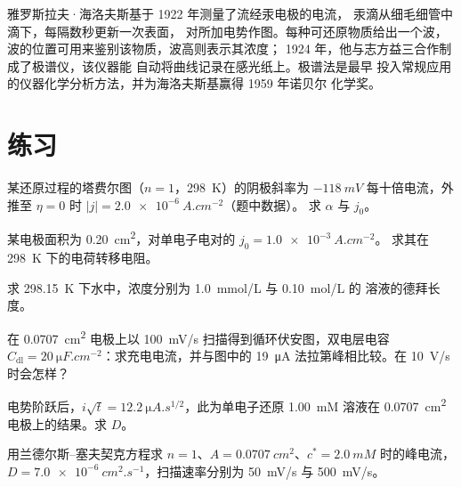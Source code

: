 \begin{history}[海洛夫斯基的极谱仪，1922 年]
雅罗斯拉夫·海洛夫斯基于 1922 年测量了流经汞电极的电流，
汞滴从细毛细管中滴下，每隔数秒更新一次表面，
对所加电势作图。每种可还原物质给出一个波，
波的位置可用来鉴别该物质，波高则表示其浓度；
1924 年，他与志方益三合作制成了极谱仪，该仪器能
自动将曲线记录在感光纸上。极谱法是最早
投入常规应用的仪器化学分析方法，并为海洛夫斯基赢得 1959 年诺贝尔
化学奖。
\end{history}

\section{练习}

\begin{exercise}[$\star$]\label{exo:b3:electrode-kinetics:1}
某还原过程的塔费尔图（$n = 1$，\qty{298}{K}）的阴极斜率为 $-\qty{118}{mV}$
每十倍电流，外推至 $\eta = 0$ 时 $|j| = \qty{2.0e-6}{A.cm^{-2}}$（题中数据）。
求 $\alpha$ 与 $j_0$。
\end{exercise}

\begin{exercise}[$\star$]\label{exo:b3:electrode-kinetics:2}
某电极面积为 \qty{0.20}{cm^2}，对单电子电对的 $j_0 = \qty{1.0e-3}{A.cm^{-2}}$。
求其在 \qty{298}{K} 下的电荷转移电阻。
\end{exercise}

\begin{exercise}[$\star$]\label{exo:b3:electrode-kinetics:3}
求 \qty{298.15}{K} 下水中，浓度分别为 \qty{1.0}{mmol/L} 与 \qty{0.10}{mol/L}
的  溶液的德拜长度。
\end{exercise}

\begin{exercise}[$\star$]\label{exo:b3:electrode-kinetics:4}
在 \qty{0.0707}{cm^2} 电极上以 \qty{100}{mV/s} 扫描得到循环伏安图，双电层电容 $C_{\mathrm{dl}} =
\qty{20}{\micro F.cm^{-2}}$：求充电电流，并与图中的
\qty{19}{\micro A} 法拉第峰相比较。在 \qty{10}{V/s} 时会怎样？
\end{exercise}

\begin{exercise}[$\star\star$]\label{exo:b3:electrode-kinetics:5}
电势阶跃后，$i\sqrt t = \qty{12.2}{\micro A.s^{1/2}}$，此为单电子还原
\qty{1.00}{mM} 溶液在 \qty{0.0707}{cm^2} 电极上的结果。求 $D$。
\end{exercise}

\begin{exercise}[$\star\star$]\label{exo:b3:electrode-kinetics:6}
用兰德尔斯–塞夫契克方程求 $n = 1$、$A = \qty{0.0707}{cm^2}$、$c^* = \qty{2.0}{mM}$ 时的峰电流，
$D = \qty{7.0e-6}{cm^2.s^{-1}}$，扫描速率分别为 \qty{50}{mV/s} 与 \qty{500}{mV/s}。
\end{exercise}

